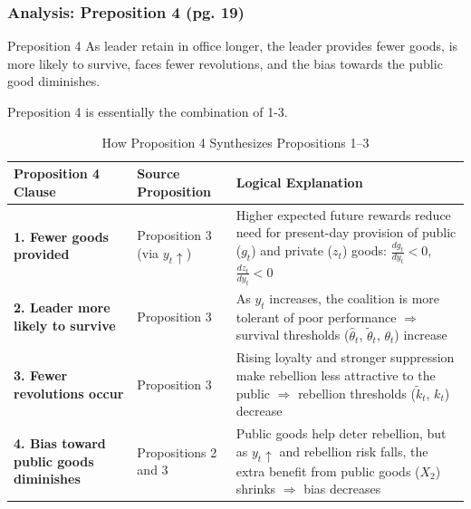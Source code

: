 \documentclass[10pt,handout]{beamer}
\begin{document}
\begin{frame}
\frametitle{Analysis: Preposition 4 (pg. 19)}
\vfill
\begin{block}{Preposition 4}
    As leader retain in office longer, the leader provides fewer goods, is more likely to survive, faces fewer revolutions, and the bias towards the public good diminishes.
\end{block}
Preposition 4 is essentially the combination of 1-3.
\begin{table}[ht]
\centering
\scriptsize
\renewcommand{\arraystretch}{1.2}
\setlength{\tabcolsep}{6pt}
\begin{tabular}{|p{3.5cm}|p{2cm}|p{5cm}|}
\hline
\textbf{Proposition 4 Clause} & \textbf{Source Proposition} & \textbf{Logical Explanation} \\
\hline
\textbf{1. Fewer goods provided} & Proposition 3 (via $y_t \uparrow$) & Higher expected future rewards reduce need for present-day provision of public ($g_t$) and private ($z_t$) goods: $\frac{d g_t}{d y_t} < 0$, $\frac{d z_t}{d y_t} < 0$ \\
\hline
\textbf{2. Leader more likely to survive} & Proposition 3 & As $y_t$ increases, the coalition is more tolerant of poor performance $\Rightarrow$ survival thresholds ($\hat{\theta}_t$, $\tilde{\theta}_t$, $\theta_t$) increase \\
\hline
\textbf{3. Fewer revolutions occur} & Proposition 3 & Rising loyalty and stronger suppression make rebellion less attractive to the public $\Rightarrow$ rebellion thresholds ($\tilde{k}_t$, $k_t$) decrease \\
\hline
\textbf{4. Bias toward public goods diminishes} & Propositions 2 and 3 & Public goods help deter rebellion, but as $y_t \uparrow$ and rebellion risk falls, the extra benefit from public goods ($X_2$) shrinks $\Rightarrow$ bias decreases \\
\hline
\end{tabular}
\caption{How Proposition 4 Synthesizes Propositions 1–3}
\end{table}
\end{frame}
\end{document}
